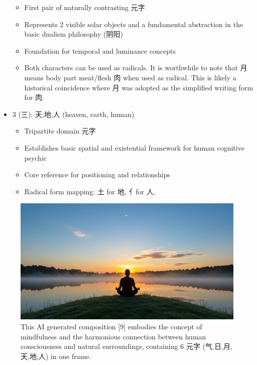 \begin{itemize}
  \begin{itemize}
  \tightlist
  \item
    First pair of naturally contrasting 元字
  \item
    Represents 2 visible solar objects and a fundamental abstraction in
    the basic dualism philosophy (阴阳)
  \item
    Foundation for temporal and luminance concepts
  \item
    Both characters can be used as radicals. It is worthwhile to note
    that 月 means body part meat/flesh 肉 when used as radical. This is
    likely a historical coincidence where 月 was adopted as the
    simplified writing form for 肉.
  \end{itemize}
\item
  3 (三): 天,地,人 (heaven, earth, human)

  \begin{itemize}
  \tightlist
  \item
    Tripartite domain 元字
  \item
    Establishes basic spatial and existential framework for human
    cognitive psychic
  \item
    Core reference for positioning and relationships
  \item
    Radical form mapping: 土 for 地, 亻for 人.
  \end{itemize}
\end{itemize}

\begin{figure}
\centering
\includegraphics{./images/sun-moon-heaven-human-earth-meditation-morning.jpg}
\caption{This AI generated composition {[}9{]} embodies the concept of
mindfulness and the harmonious connection between human consciousness
and natural surroundings, containing 6 元字 (气,日,月,天,地,人) in one
frame.}
\end{figure}

